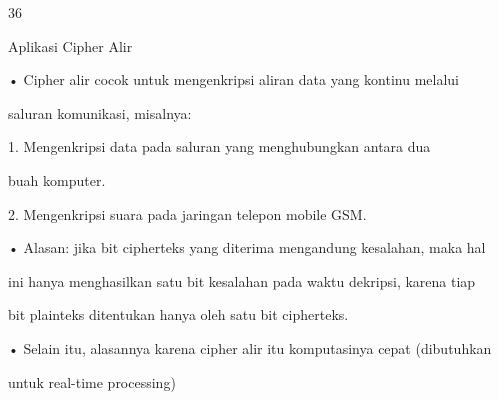 \documentclass{article}
\begin{document}

36

Aplikasi Cipher Alir

• Cipher alir cocok untuk mengenkripsi aliran data yang kontinu melalui 

saluran komunikasi, misalnya:

   1. Mengenkripsi data pada saluran yang menghubungkan  antara dua 

buah komputer.

 2. Mengenkripsi suara pada jaringan telepon mobile GSM.

• Alasan: jika bit cipherteks yang diterima mengandung kesalahan, maka hal 

ini hanya menghasilkan satu bit kesalahan pada waktu dekripsi, karena tiap 

bit plainteks ditentukan hanya oleh satu bit cipherteks.

• Selain itu, alasannya karena cipher alir itu komputasinya cepat (dibutuhkan 

untuk real-time processing)
\end{document}
